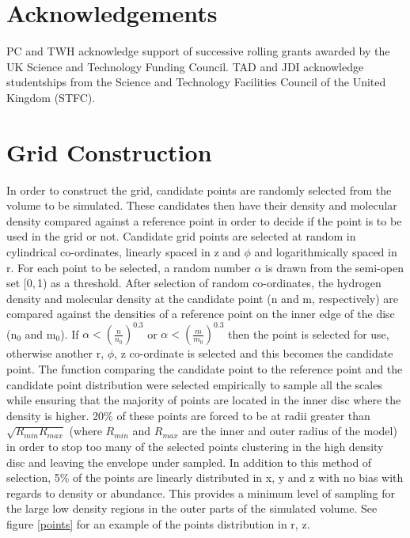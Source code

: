\documentclass[useAMS,usenatbib]{mn2e}
\begin{document}
\section*{Acknowledgements}
PC and TWH acknowledge support of successive rolling grants awarded by the UK Science and Technology Funding Council. 
TAD and JDI acknowledge studentships from the Science and Technology Facilities Council of the United Kingdom (STFC).


 


\appendix

\section{Grid Construction} \label{sec:gridding} 

In order to construct the grid, candidate points are randomly selected from the volume to be simulated. These candidates then have their density and molecular density compared against a reference point in order to decide if the point is to be used in the grid or not. Candidate grid points are selected at random in cylindrical co-ordinates, linearly spaced in z and $\phi$ and logarithmically spaced in r. For each point to be selected, a random number $\alpha$ is drawn from the semi-open set [0,$\,$1) as a threshold. After selection of random co-ordinates, the hydrogen density and molecular density at the candidate point (n and m, respectively) are compared against the densities of a reference point on the inner edge of the disc (n$_0$ and m$_0$). If $\alpha<\left( \frac{n}{n_0} \right)^{0.3}$ or $\alpha< \left( \frac{m}{m_0} \right)^{0.3}$ then the point is selected for use, otherwise another r, $\phi$, z co-ordinate is selected and this becomes the candidate point. The function comparing the candidate point to the reference point and the candidate point distribution were selected empirically to sample all the scales while ensuring that the majority of points are located in the inner disc where the density is higher. 20\% of these points are forced to be at radii greater than $\sqrt{R_{min}R_{max}}$ (where $R_{min}$ and $R_{max}$ are the inner and outer radius of the model) in order to stop too many of the selected points clustering in the high density disc and leaving the envelope under sampled. In addition to this method of selection, 5\% of the points are linearly distributed in x, y and z with no bias with regards to density or abundance. This provides a minimum level of sampling for the large low density regions in the outer parts of the simulated volume. See figure \ref{points} for an example of the points distribution in r, z. \newline
\end{document}
